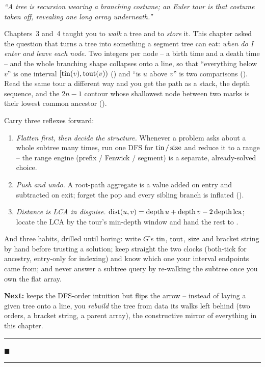 \begin{lastword}
\emph{``A tree is recursion wearing a branching costume; an Euler tour is that costume taken
off, revealing one long array underneath.''}

\medskip
Chapters~3 and~4 taught you to \emph{walk} a tree and to \emph{store} it. This chapter asked the
question that turns a tree into something a segment tree can eat: \emph{when do I enter and leave
each node}. Two integers per node -- a birth time and a death time -- and the whole branching
shape collapses onto a line, so that ``everything below $v$'' is one interval
$[\operatorname{tin}(v),\operatorname{tout}(v))$ () and ``is $u$ above $v$'' is two comparisons
(). Read the same tour a different way and you get the path as a stack, the
depth sequence, and the $2n{-}1$ contour whose shallowest node between two marks is their lowest
common ancestor ().

\medskip
Carry three reflexes forward:
\begin{enumerate}[nosep, leftmargin=1.6em]
  \item \emph{Flatten first, then decide the structure.} Whenever a problem asks about a whole
        subtree many times, run one DFS for $\operatorname{tin}/\operatorname{size}$ and reduce it to a range -- the range
        engine (prefix / Fenwick / segment) is a separate, already-solved choice.
  \item \emph{Push and undo.} A root-path aggregate is a value added on entry and subtracted on
        exit; forget the pop and every sibling branch is inflated ().
  \item \emph{Distance is LCA in disguise.} $\operatorname{dist}(u,v)=\operatorname{depth} u+\operatorname{depth} v-2\operatorname{depth}{\operatorname{lca}}$; locate
        the LCA by the tour's min-depth window and hand the rest to .
\end{enumerate}

\medskip
And three habits, drilled until boring: write $G$'s $\operatorname{tin}$, $\operatorname{tout}$, $\operatorname{size}$ and bracket string
by hand before trusting a solution; keep straight the two clocks (both-tick for ancestry,
entry-only for indexing) and know which one your interval endpoints came from; and never answer
a subtree query by re-walking the subtree once you own the flat array.

\medskip
\textbf{Next:}  keeps the DFS-order intuition but flips the arrow -- instead of laying
a given tree onto a line, you \emph{rebuild} the tree from data its walks left behind (two
orders, a bracket string, a parent array), the constructive mirror of everything in this chapter.

\begin{center}\textcolor{softpurple}{\rule{0.4\linewidth}{0.6pt}\quad $\blacksquare$\quad \rule{0.4\linewidth}{0.6pt}}\end{center}
\end{lastword}
